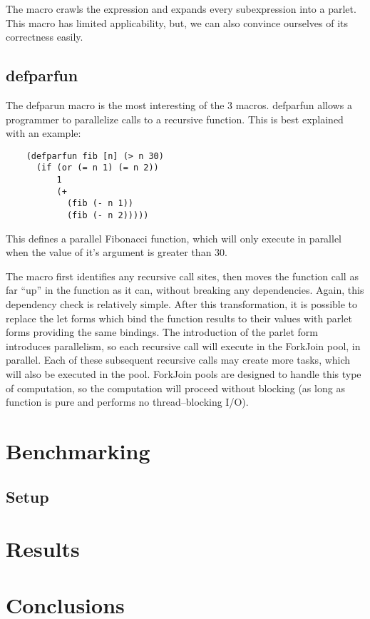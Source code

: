 \documentclass{sig-alternate}
\begin{document}
The macro crawls the expression and expands every subexpression into a parlet.
This macro has limited applicability, but, we can also convince ourselves of its correctness easily.

\subsection{defparfun}

The defparun macro is the most interesting of the 3 macros.
defparfun allows a programmer to parallelize calls to a recursive function.
This is best explained with an example:

\begin{verbatim}
    (defparfun fib [n] (> n 30)
      (if (or (= n 1) (= n 2))
          1
          (+
            (fib (- n 1))
            (fib (- n 2)))))
\end{verbatim}

This defines a parallel Fibonacci function, which will only execute in parallel when the value of it's argument is greater than 30.

The macro first identifies any recursive call sites, then moves the function call as far ``up'' in the function as it can, without breaking any dependencies.
Again, this dependency check is relatively simple.
After this transformation, it is possible to replace the let forms which bind the function results to their values with parlet forms providing the same bindings.
The introduction of the parlet form introduces parallelism, so each recursive call will execute in the ForkJoin pool, in parallel.
Each of these subsequent recursive calls may create more tasks, which will also be executed in the pool.
ForkJoin pools are designed to handle this type of computation, so the computation will proceed without blocking (as long as function is pure and performs no thread--blocking I/O).

\section{Benchmarking}
\subsection{Setup}

\section{Results}

\section{Conclusions}


\end{document}
